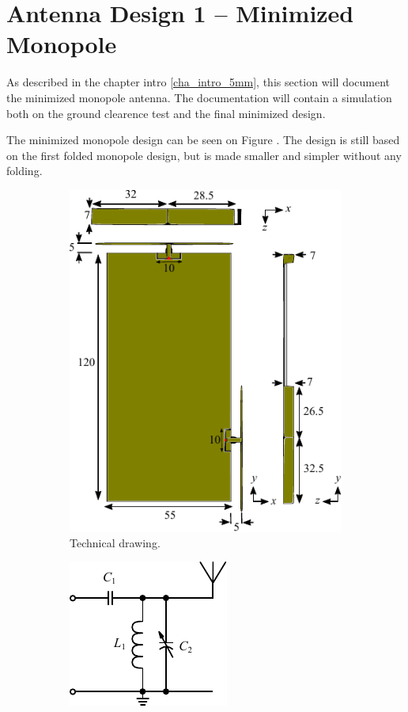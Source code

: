 \section{Antenna Design 1 -- Minimized Monopole}
\label{sec:techsol1_monopole_5mm}
\begin{aautop}
As described in the chapter intro \ref{cha_intro_5mm}, this section will document the minimized monopole antenna. The documentation will contain a simulation both on the ground clearence test and the final minimized design.      
\end{aautop}

The minimized monopole design can be seen on Figure . The design is still based on the first folded monopole design, but is made smaller and simpler without any folding.

\begin{figure}[htbp]
    \begin{subfigure}[b]{0.49\linewidth}
        \centering
        \includegraphics{img/tech_sol/monopole/5mm/3d_drawing/3d_drawing}
        \caption{Technical drawing.}
        \label{fig:ant1technical_6pf}
    \end{subfigure}
    \hfill
    \begin{subfigure}[b]{0.49\linewidth}
        \centering
        \includegraphics{img/tech_sol/schematic_tuning_1}\\[1cm]

\end{subfigure}
\end{figure}
